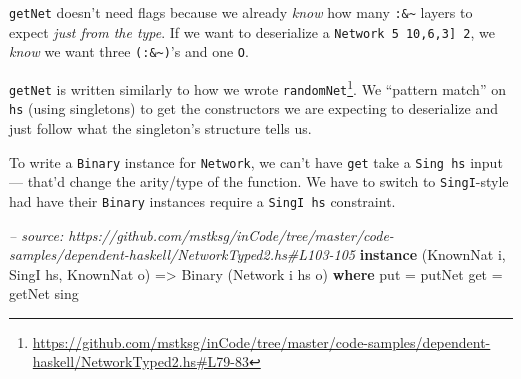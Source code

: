 \documentclass[]{article}
\newenvironment{Shaded}{\begin{snugshade}}{\end{snugshade}}
\newcommand{\CommentTok}[1]{\textcolor[rgb]{0.56,0.35,0.01}{\textit{#1}}}
\newcommand{\DataTypeTok}[1]{\textcolor[rgb]{0.13,0.29,0.53}{#1}}
\newcommand{\FunctionTok}[1]{\textcolor[rgb]{0.00,0.00,0.00}{#1}}
\newcommand{\KeywordTok}[1]{\textcolor[rgb]{0.13,0.29,0.53}{\textbf{#1}}}
\newcommand{\NormalTok}[1]{#1}
\newcommand{\OtherTok}[1]{\textcolor[rgb]{0.56,0.35,0.01}{#1}}
\renewcommand{\href}[2]{#2\footnote{\url{#1}}}
\begin{document}
\begin{Shaded}
\end{Shaded}

\texttt{getNet} doesn't need flags because we already \emph{know} how many
\texttt{:\&\textasciitilde{}} layers to expect \emph{just from the type}. If we
want to deserialize a \texttt{Network\ 5\ \textquotesingle{}{[}10,6,3{]}\ 2}, we
\emph{know} we want three \texttt{(:\&\textasciitilde{})}'s and one \texttt{O}.

\texttt{getNet} is written similarly to how we wrote
\href{https://github.com/mstksg/inCode/tree/master/code-samples/dependent-haskell/NetworkTyped2.hs\#L79-83}{\texttt{randomNet\textquotesingle{}}}.
We ``pattern match'' on \texttt{hs} (using singletons) to get the constructors
we are expecting to deserialize and just follow what the singleton's structure
tells us.

To write a \texttt{Binary} instance for \texttt{Network}, we can't have
\texttt{get} take a \texttt{Sing\ hs} input --- that'd change the arity/type of
the function. We have to switch to \texttt{SingI}-style had have their
\texttt{Binary} instances require a \texttt{SingI\ hs} constraint.

\begin{Shaded}
\begin{Highlighting}[]
\CommentTok{-- source: https://github.com/mstksg/inCode/tree/master/code-samples/dependent-haskell/NetworkTyped2.hs#L103-105}
\KeywordTok{instance}\NormalTok{ (}\DataTypeTok{KnownNat}\NormalTok{ i, }\DataTypeTok{SingI}\NormalTok{ hs, }\DataTypeTok{KnownNat}\NormalTok{ o) }\OtherTok{=>} \DataTypeTok{Binary}\NormalTok{ (}\DataTypeTok{Network}\NormalTok{ i hs o) }\KeywordTok{where}
\NormalTok{    put }\FunctionTok{=}\NormalTok{ putNet}
\NormalTok{    get }\FunctionTok{=}\NormalTok{ getNet sing}
\end{Highlighting}
\end{Shaded}
\end{document}
